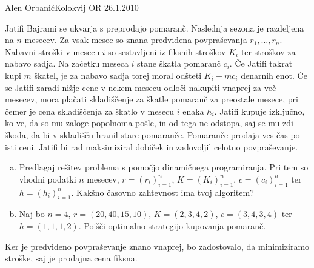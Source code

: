 \begin{naloga}{Alen Orbanić}{Kolokvij OR 26.1.2010}
\begin{vprasanje}
Jatifi Bajrami se ukvarja s preprodajo pomaranč.
Naslednja sezona je razdeljena na $n$ mesecev.
Za vsak mesec so znana predvidena povpraševanja $r_1, \dots, r_n$.
Nabavni stroški v mesecu $i$ so sestavljeni iz fiksnih stroškov $K_i$
ter stroškov za nabavo sadja.
Na začetku meseca $i$ stane škatla pomaranč $c_i$.
Če Jatifi takrat kupi $m$ škatel,
je za nabavo sadja torej moral odšteti $K_i + mc_i$ denarnih enot.
Če se Jatifi zaradi nižje cene v nekem mesecu
odloči nakupiti vnaprej za več mesecev,
mora plačati skladiščenje za škatle pomaranč za preostale mesece,
pri čemer je cena skladiščenja za škatlo v mesecu $i$ enaka $h_i$.
Jatifi kupuje izključno, ko ve, da so mu zaloge popolnoma pošle,
in od tega ne odstopa, saj se mu zdi škoda,
da bi v skladišču hranil stare pomaranče.
Pomaranče prodaja ves čas po isti ceni.
Jatifi bi rad maksimiziral dobiček in zadovoljil celotno povpraševanje.

\begin{enumerate}[(a)]
\item Predlagaj rešitev problema s pomočjo dinamičnega programiranja.
Pri tem so vhodni podatki $n$ mesecev, $r = (r_i)_{i=1}^n$,
$K = (K_i)_{i=1}^n$, $c = (c_i)_{i=1}^n$ ter $h = (h_i)_{i=1}^n$.
Kakšno časovno zahtevnost ima tvoj algoritem?

\item Naj bo $n = 4$, $r = (20, 40, 15, 10)$, $K = (2, 3, 4, 2)$,
$c = (3, 4, 3, 4)$ ter $h = (1, 1, 1, 2)$.
Poišči optimalno strategijo kupovanja pomaranč.
\end{enumerate}
\end{vprasanje}

\begin{odgovor}
Ker je predvideno povpraševanje znano vnaprej,
bo zadostovalo, da minimiziramo stroške,
saj je prodajna cena fiksna.


\end{odgovor}
\end{naloga}
